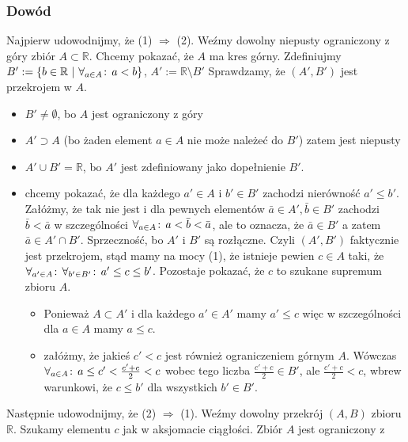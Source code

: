 \documentclass[9pt]{article}
\begin{document}
\subsubsection*{Dowód}
Najpierw udowodnijmy, że (1) $\Rightarrow$ (2). Weźmy dowolny niepusty ograniczony z góry zbiór
$A \subset \mathbb{R}$. Chce\-my pokazać, że $A$ ma kres górny. Zdefiniujmy $B' := \{b \in
\mathbb{R} \ |\  \forall_{a \in A} \! : \, a < b\}$, $A' := \mathbb{R} \setminus B'$ Sprawdzamy, że
$\left( A', B'\right)$ jest przekrojem w $A$.
\begin{itemize}
    \item $B' \ne \emptyset$, bo $A$ jest ograniczony z góry
    \item $A' \supset A$ (bo żaden element $a \in A$ nie może należeć do $B'$) zatem jest
        niepusty
    \item $A' \cup B' = \mathbb{R}$, bo $A'$ jest zdefiniowany jako dopełnienie $B'$.
    \item chcemy pokazać, że dla każdego $a' \in A$ i $b' \in B'$ zachodzi nierówność $a' \le
        b'$. Załóżmy, że tak nie jest i dla pewnych elementów $\bar{a} \in A', \bar{b} \in B'$
        zachodzi $\bar{b} < \bar{a}$ w szczególności $\forall_{a \in A} \! : \, a < \bar{b} <
        \bar{a}$, ale to oznacza, że $\bar{a} \in B'$ a zatem $\bar{a} \in A' \cap B'$.
        Sprzeczność, bo $A'$ i $B'$ są rozłączne. Czyli $\left(A', B'\right)$ faktycznie jest
        przekrojem, stąd mamy na mocy (1), że istnieje pewien $c \in A$ taki, że $\forall_{a'
        \in A} \! : \, \forall_{b' \in B'} \! : \, a' \le c \le b'$.
        Pozostaje pokazać, że $c$ to szukane supremum zbioru $A$.
        \begin{itemize}
            \item Ponieważ $A \subset A'$ i dla każdego $a' \in A'$ mamy $a' \le c$ więc w
                szczególności dla $a \in A$ mamy $a \le c$.
            \item załóżmy, że jakieś $c' < c$ jest również ograniczeniem górnym $A$. Wówczas
                $\forall_{a\in A} \! : \, a \le c' < \frac{c'+c}{2} < c$ wobec tego liczba
                $\frac{c'+c}{2} \in B'$, ale $\frac{c'+c}{2} < c$, wbrew warunkowi, że $c \le
                b'$ dla wszystkich $b' \in B'$.
        \end{itemize}
\end{itemize}
Następnie udowodnijmy, że (2) $\Rightarrow$ (1). Weźmy dowolny przekrój $(A, B)$ zbioru
$\mathbb{R}$. Szukamy elementu $c$ jak w aksjomacie ciągłości. Zbiór $A$ jest ograniczony z
\end{document}
